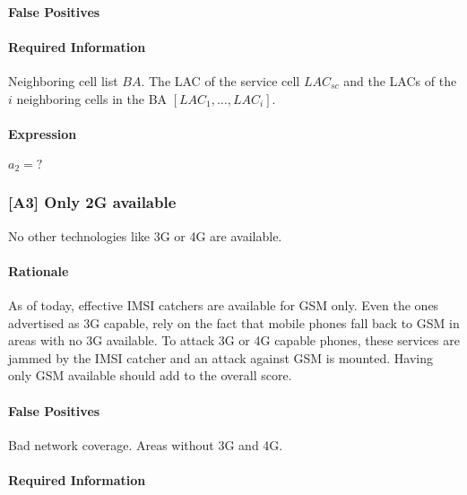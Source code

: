 \documentclass[a4paper,11pt,notitlepage,bigheadings,oneside]{scrartcl}
\begin{document}
\paragraph{False Positives}


\paragraph{Required Information}

Neighboring cell list $BA$. The LAC of the service cell $LAC_{sc}$ and the LACs
of the $i$ neighboring cells in the BA $[LAC_1,…,LAC_i]$.

\paragraph{Expression}

$a_2 = ?$


\subsubsection{[A3] Only 2G available}

No other technologies like 3G or 4G are available.

\paragraph{Rationale}

As of today, effective IMSI catchers are available for GSM only. Even the ones
advertised as 3G capable, rely on the fact that mobile phones fall back to GSM
in areas with no 3G available. To attack 3G or 4G capable phones, these
services are jammed by the IMSI catcher and an attack against GSM is mounted.
Having only GSM available should add to the overall score.

\paragraph{False Positives}

Bad network coverage. Areas without 3G and 4G.

\paragraph{Required Information}
\end{document}
